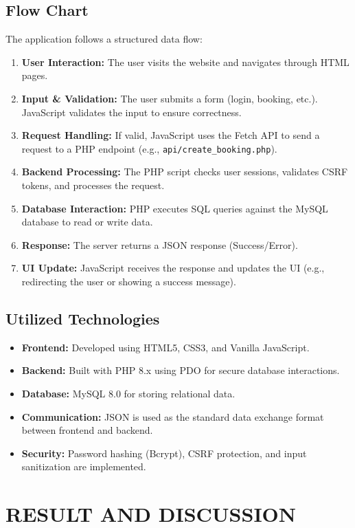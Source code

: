 \documentclass[12pt]{report}
\begin{document}
\section{Flow Chart}
The application follows a structured data flow:
\begin{enumerate}
    \item \textbf{User Interaction:} The user visits the website and navigates through HTML pages.
    \item \textbf{Input \& Validation:} The user submits a form (login, booking, etc.). JavaScript validates the input to ensure correctness.
    \item \textbf{Request Handling:} If valid, JavaScript uses the Fetch API to send a request to a PHP endpoint (e.g., \texttt{api/create\_booking.php}).
    \item \textbf{Backend Processing:} The PHP script checks user sessions, validates CSRF tokens, and processes the request.
    \item \textbf{Database Interaction:} PHP executes SQL queries against the MySQL database to read or write data.
    \item \textbf{Response:} The server returns a JSON response (Success/Error).
    \item \textbf{UI Update:} JavaScript receives the response and updates the UI (e.g., redirecting the user or showing a success message).
\end{enumerate}

\section{Utilized Technologies}
\begin{itemize}
    \item \textbf{Frontend:} Developed using HTML5, CSS3, and Vanilla JavaScript.
    \item \textbf{Backend:} Built with PHP 8.x using PDO for secure database interactions.
    \item \textbf{Database:} MySQL 8.0 for storing relational data.
    \item \textbf{Communication:} JSON is used as the standard data exchange format between frontend and backend.
    \item \textbf{Security:} Password hashing (Bcrypt), CSRF protection, and input sanitization are implemented.
\end{itemize}

\chapter{RESULT AND DISCUSSION}
\label{chap:result}
\end{document}
